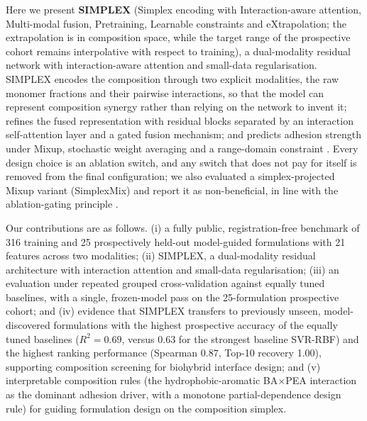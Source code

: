 \documentclass[utf8]{FrontiersinHarvard}
\begin{document}
Here we present \textbf{SIMPLEX} (Simplex encoding with Interaction-aware attention, Multi-modal fusion, Pretraining, Learnable constraints and eXtrapolation; the extrapolation is in composition space, while the target range of the prospective cohort remains interpolative with respect to training), a dual-modality residual network with interaction-aware attention and small-data regularisation. SIMPLEX encodes the composition through two explicit modalities, the raw monomer fractions and their pairwise interactions, so that the model can represent composition synergy rather than relying on the network to invent it; refines the fused representation with residual blocks separated by an interaction self-attention layer and a gated fusion mechanism; and predicts adhesion strength under Mixup, stochastic weight averaging and a range-domain constraint \cite{he2016resnet,kingma2015adam,loshchilov2019adamw,smith2019onecycle,hornik1989mlp,vaswani2017attention,perez2018film,foret2021sam,srivastava2014dropout,ioffe2015batchnorm,hendrycks2016gelu,yun2020transformers,shahriari2016bayesian,chu2020smooth,chen2022activelearning,snelson2006gp,settles2009al,recent2021karniadaki,recent2022cuomo,recent2023pyun,recent2025xue,recent2024wang}. Every design choice is an ablation switch, and any switch that does not pay for itself is removed from the final configuration; we also evaluated a simplex-projected Mixup variant (SimplexMix) and report it as non-beneficial, in line with the ablation-gating principle \cite{egozcue2003clr,cole2020design,wang2023hydrogelML,pawlowsky2015modeling}.

Our contributions are as follows. (i) a fully public, registration-free benchmark of 316 training and 25 prospectively held-out model-guided formulations with 21 features across two modalities; (ii) SIMPLEX, a dual-modality residual architecture with interaction attention and small-data regularisation; (iii) an evaluation under repeated grouped cross-validation against equally tuned baselines, with a single, frozen-model pass on the 25-formulation prospective cohort; and (iv) evidence that SIMPLEX transfers to previously unseen, model-discovered formulations with the highest prospective accuracy of the equally tuned baselines ($R^2 = 0.69$, versus 0.63 for the strongest baseline SVR-RBF) and the highest ranking performance (Spearman $0.87$, Top-10 recovery 1.00), supporting composition screening for biohybrid interface design; and (v) interpretable composition rules (the hydrophobic-aromatic BA$\times$PEA interaction as the dominant adhesion driver, with a monotone partial-dependence design rule) for guiding formulation design on the composition simplex.
\end{document}

